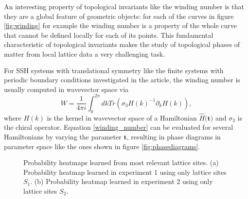 \documentclass[fleqn,10pt]{wlscirep}
\begin{document}
An interesting property of topological invariants like the winding number is that they are a global feature of geometric objects: for each of the curves in figure \ref{fig:winding} for example the winding number is a property of the whole curve that cannot be defined locally for each of its points. This fundamental characteristic of topological invariants makes the study of topological phases of matter from local lattice data a very challenging task.   

For SSH systems with translational symmetry like the finite systems with periodic boundary conditions investigated in the article, the winding number is usually computed in wavevector space via
\begin{equation}\label{winding_number}
W=\frac{1}{4\pi i}\int_0^{2\pi} dk Tr( \sigma_3 H(k)^{-1} \partial_k H(k)),
\end{equation}
where $H(k)$ is the kernel in wavevector space of a Hamiltonian $\hat{H}$$($$\mathbf{t}$$)$ and $\sigma_3$ is the chiral operator. Equation \eqref{winding_number} can be evaluated for several Hamiltonians by varying the parameter $\mathbf{t}$, resulting in phase diagrams in parameter space like the ones shown in figure \ref{fig:phasediagrams}.

\begin{figure}
\centering
{}
\caption{Probability heatmaps learned from most relevant lattice sites. (a) Probability heatmap learned in experiment 1 using only lattice sites $S_1$.  (b) Probability heatmap learned in experiment 2 using only lattice sites $S_2$.}
\label{less_feat}
\end{figure}
\end{document}
